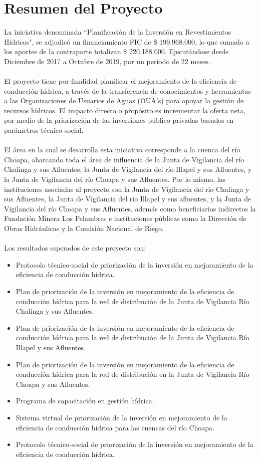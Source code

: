 \documentclass[]{article}
\begin{document}
\section{Resumen del Proyecto}

La iniciativa denominada ``Planificación de la Inversión en Revestimientos Hídricos", se adjudicó un financiamiento FIC de \$ 199.968.000, lo que sumado a los aportes de la contraparte totalizan \$ 220.188.000. Ejecutándose desde Diciembre de 2017 a Octubre de 2019, por un período de 22 meses.\\
\\
El proyecto tiene por finalidad planificar el mejoramiento de la eficiencia de conducción hídrica, a través de la transferencia de conocimientos y herramientas a las Organizaciones de Usuarios de Aguas (OUA's) para apoyar la gestión de recursos hídricos. El impacto directo o propósito es incrementar la oferta neta, por medio de la priorización de las inversiones público-privadas basados en parámetros técnico-social.\\
\\
El área en la cual se desarrolla esta iniciativa corresponde a la cuenca del río Choapa, abarcando toda el área de influencia de la Junta de Vigilancia del río Chalinga y sus Afluentes, la Junta de Vigilancia del río Illapel y sus Afluentes, y la Junta de Vigilancia del río Choapa y sus Afluentes. Por lo mismo, las instituciones asociadas al proyecto son la Junta de Vigilancia del río Chalinga y sus Afluentes, la Junta de Vigilancia del río Illapel y sus afluentes, y la Junta de Vigilancia del río Choapa y sus Afluentes, además como beneficiarios indirectos la Fundación Minera Los Pelambres e instituciones públicas como la Dirección de Obras Hidráulicas y la Comisión Nacional de Riego.\\
\\
Los resultados esperados de este proyecto son:
\begin{itemize}
\item Protocolo técnico-social de priorización de la inversión en mejoramiento de la eficiencia de conducción hídrica.
\item Plan de priorización de la inversión en mejoramiento de la eficiencia de conducción hídrica para la red de distribución de la Junta de Vigilancia Río Chalinga y sus Afluentes.
\item Plan de priorización de la inversión en mejoramiento de la eficiencia de conducción hídrica para la red de distribución de la Junta de Vigilancia Río Illapel y sus Afluentes.
\item Plan de priorización de la inversión en mejoramiento de la eficiencia de conducción hídrica para la red de distribución en la Junta de Vigilancia Río Choapa y sus Afluentes.
\item Programa de capacitación en gestión hídrica.
\item Sistema virtual de priorización de la inversión en mejoramiento de la eficiencia de conducción hídrica para las cuencas del río Choapa.
\item Protocolo técnico-social de priorización de la inversión en mejoramiento de la eficiencia de conducción hídrica.
\end{itemize}
\end{document}
